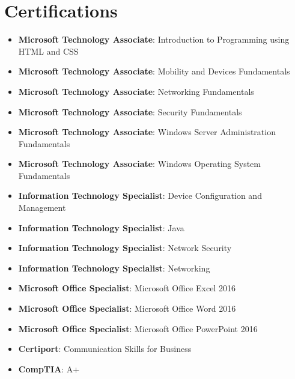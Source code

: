 \documentclass[letterpaper,11pt]{article}
\newcommand{\resumeItem}[2]{
  \item\small{
    \textbf{#1}{: #2 \vspace{-2pt}}
  }
}
\newcommand{\resumeSubItem}[2]{\resumeItem{#1}{#2}\vspace{-4pt}}
\newcommand{\resumeSubHeadingListStart}{\begin{itemize}[leftmargin=*]}
\newcommand{\resumeSubHeadingListEnd}{\end{itemize}}
\begin{document}
\section{Certifications}
\resumeSubHeadingListStart
\resumeSubItem{Microsoft Technology Associate}
{Introduction to Programming using HTML and CSS}
\resumeSubItem{Microsoft Technology Associate}
{Mobility and Devices Fundamentals}
\resumeSubItem{Microsoft Technology Associate}
{Networking Fundamentals}
\resumeSubItem{Microsoft Technology Associate}
{Security Fundamentals}
\resumeSubItem{Microsoft Technology Associate}
{Windows Server Administration Fundamentals}
\resumeSubItem{Microsoft Technology Associate}
{Windows Operating System Fundamentals}
\resumeSubItem{Information Technology Specialist}
{Device Configuration and Management}
\resumeSubItem{Information Technology Specialist}
{Java}
\resumeSubItem{Information Technology Specialist}
{Network Security}
\resumeSubItem{Information Technology Specialist}
{Networking}
\resumeSubItem{Microsoft Office Specialist}
{Microsoft Office Excel 2016}
\resumeSubItem{Microsoft Office Specialist}
{Microsoft Office Word 2016}
\resumeSubItem{Microsoft Office Specialist}
{Microsoft Office PowerPoint 2016}
\resumeSubItem{Certiport}
{Communication Skills for Business}
\resumeSubItem{CompTIA}
{A+}
\resumeSubHeadingListEnd


\end{document}
